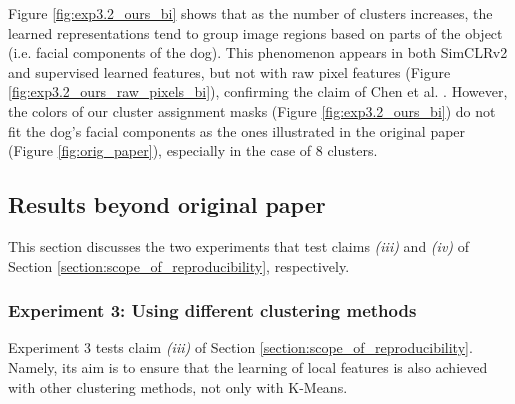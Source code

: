         Figure \ref{fig:exp3.2_ours_bi} shows that as the number of clusters increases, the learned representations tend to group image regions based on parts of the object (i.e. facial components of the dog). This phenomenon appears in both SimCLRv2 and supervised learned features, but not with raw pixel features (Figure \ref{fig:exp3.2_ours_raw_pixels_bi}), confirming the claim of Chen et al. \cite{chen2021intriguing}. However, the colors of our cluster assignment masks (Figure \ref{fig:exp3.2_ours_bi}) do not fit the dog's facial components as the ones illustrated in the original paper (Figure \ref{fig:orig_paper}), especially in the case of 8 clusters.

        
    
\subsection{Results beyond original paper}
This section discusses the two experiments that test claims \textit{(iii)} and \textit{(iv)} of Section \ref{section:scope_of_reproducibility}, respectively.

    \subsubsection{Experiment 3: Using different clustering methods}
    \label{subsec:exp_2}
    
        Experiment 3 tests claim \textit{(iii)} of Section \ref{section:scope_of_reproducibility}. Namely, its aim is to ensure that the learning of local features is also achieved with other clustering methods, not only with K-Means.
        
